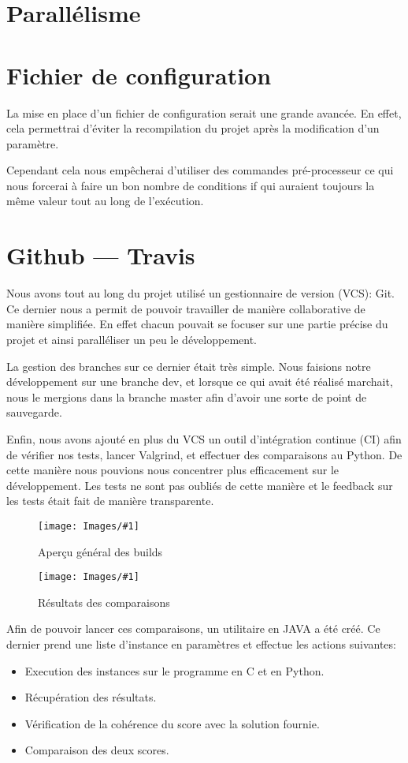 \documentclass[hideweeklyreports]{polytech/polytech}
\newcommand{\img}[3]{%
	\begin{figure}[H]
		\centering
   		\texttt{[image: Images/\#1]}
  	 	\caption{#2}
	\end{figure}
}
\begin{document}
		\section{Parallélisme} %
		
		\section{Fichier de configuration}
			La mise en place d'un fichier de configuration serait une grande avancée. En effet, cela permettrai d'éviter la recompilation du projet après la modification d'un paramètre.
			
			Cependant cela nous empêcherai d'utiliser des commandes pré-processeur ce qui nous forcerai à faire un bon nombre de conditions if qui auraient toujours la même valeur tout au long de l'exécution.
		
		\section{Github — Travis}
			Nous avons tout au long du projet utilisé un gestionnaire de version (VCS): Git. Ce dernier nous a permit de pouvoir travailler de manière collaborative de manière simplifiée. En effet chacun pouvait se focuser sur une partie précise du projet et ainsi paralléliser un peu le développement.
			
			La gestion des branches sur ce dernier était très simple. Nous faisions notre développement sur une branche dev, et lorsque ce qui avait été réalisé marchait, nous le mergions dans la branche master afin d'avoir une sorte de point de sauvegarde.
			
			Enfin, nous avons ajouté en plus du VCS un outil d'intégration continue (CI) afin de vérifier nos tests, lancer Valgrind, et effectuer des comparaisons au Python. De cette manière nous pouvions nous concentrer plus efficacement sur le développement. Les tests ne sont pas oubliés de cette manière et le feedback sur les tests était fait de manière transparente.
			\img{TravisAll.png}{Aperçu général des builds}{0.5}
			\img{TravisCompare.png}{Résultats des comparaisons}{0.575}
			
			Afin de pouvoir lancer ces comparaisons, un utilitaire en JAVA a été créé. Ce dernier prend une liste d'instance en paramètres et effectue les actions suivantes:
			\begin{itemize}
				\item Execution des instances sur le programme en C et en Python.
				\item Récupération des résultats.
				\item Vérification de la cohérence du score avec la solution fournie.
				\item Comparaison des deux scores.
			\end{itemize}
			
\end{document}
